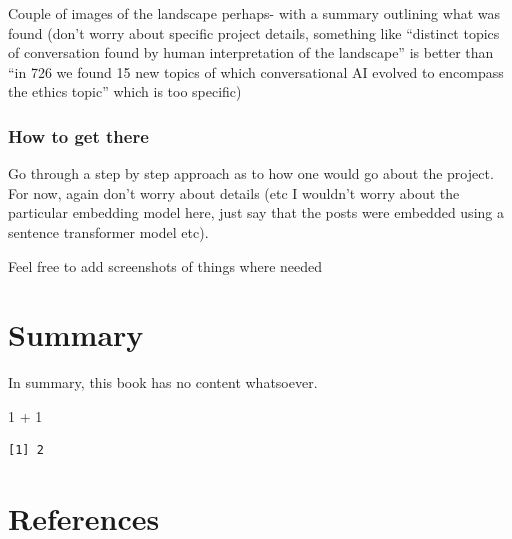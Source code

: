 \documentclass[
  letterpaper,
  DIV=11,
  numbers=noendperiod]{scrreprt}
\newenvironment{Shaded}{\begin{snugshade}}{\end{snugshade}}
\newcommand{\DecValTok}[1]{\textcolor[rgb]{0.68,0.00,0.00}{#1}}
\newcommand{\SpecialCharTok}[1]{\textcolor[rgb]{0.37,0.37,0.37}{#1}}
\newlength{\cslhangindent}
\newenvironment{CSLReferences}[2] %
 {\begin{list}{}{%
  \setlength{\itemindent}{0pt}
  \setlength{\leftmargin}{0pt}
  \setlength{\parsep}{0pt}
  \ifodd #1
   \setlength{\leftmargin}{\cslhangindent}
   \setlength{\itemindent}{-1\cslhangindent}
  \fi
  \setlength{\itemsep}{#2\baselineskip}}}
 {\end{list}}
\begin{document}
Couple of images of the landscape perhaps- with a summary outlining what
was found (don't worry about specific project details, something like
``distinct topics of conversation found by human interpretation of the
landscape'' is better than ``in 726 we found 15 new topics of which
conversational AI evolved to encompass the ethics topic'' which is too
specific)

\subsection{How to get there}\label{how-to-get-there}

Go through a step by step approach as to how one would go about the
project. For now, again don't worry about details (etc I wouldn't worry
about the particular embedding model here, just say that the posts were
embedded using a sentence transformer model etc).

Feel free to add screenshots of things where needed


\chapter{Summary}\label{summary}

In summary, this book has no content whatsoever.

\begin{Shaded}
\begin{Highlighting}[]
\DecValTok{1} \SpecialCharTok{+} \DecValTok{1}
\end{Highlighting}
\end{Shaded}

\begin{verbatim}
[1] 2
\end{verbatim}


\chapter*{References}\label{references}


\label{refs}
\begin{CSLReferences}{0}{1}
\end{CSLReferences}
\end{document}
